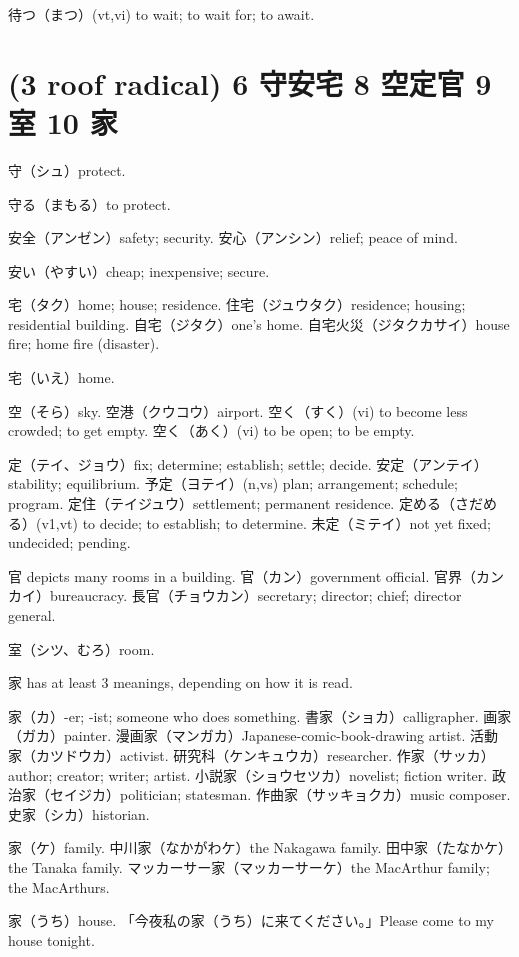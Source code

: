 待つ（まつ）(vt,vi) to wait; to wait for; to await.

\section{(3 roof radical) 6 守安宅 8 空定官 9 室 10 家}


守（シュ）protect.

守る（まもる）to protect.

安全（アンゼン）safety; security.
安心（アンシン）relief; peace of mind.

安い（やすい）cheap; inexpensive; secure.

宅（タク）home; house; residence.
住宅（ジュウタク）residence; housing; residential building.
自宅（ジタク）one's home.
自宅火災（ジタクカサイ）house fire; home fire (disaster).

宅（いえ）home.

空（そら）sky.
空港（クウコウ）airport.
空く（すく）(vi) to become less crowded; to get empty.
空く（あく）(vi) to be open; to be empty.

定（テイ、ジョウ）fix; determine; establish; settle; decide.
安定（アンテイ）stability; equilibrium.
予定（ヨテイ）(n,vs) plan; arrangement; schedule; program.
定住（テイジュウ）settlement; permanent residence.
定める（さだめる）(v1,vt) to decide; to establish; to determine.
未定（ミテイ）not yet fixed; undecided; pending.

官 depicts many rooms in a building.
官（カン）government official.
官界（カンカイ）bureaucracy.
長官（チョウカン）secretary; director; chief; director general.

室（シツ、むろ）room.

家 has at least 3 meanings, depending on how it is read.

家（カ）-er; -ist; someone who does something.
書家（ショカ）calligrapher.
画家（ガカ）painter.
漫画家（マンガカ）Japanese-comic-book-drawing artist.
活動家（カツドウカ）activist.
研究科（ケンキュウカ）researcher.
作家（サッカ）author; creator; writer; artist.
小説家（ショウセツカ）novelist; fiction writer.
政治家（セイジカ）politician; statesman.
作曲家（サッキョクカ）music composer.
史家（シカ）historian.

家（ケ）family.
中川家（なかがわケ）the Nakagawa family.
田中家（たなかケ）the Tanaka family.
マッカーサー家（マッカーサーケ）the MacArthur family; the MacArthurs.

家（うち）house.
「今夜私の家（うち）に来てください。」Please come to my house tonight.

